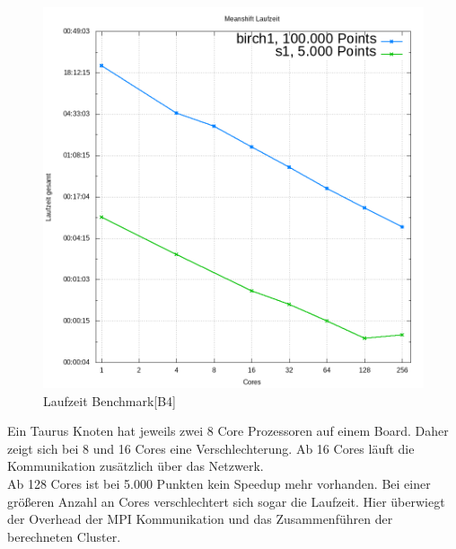 	\begin{figure}[H]
		\centering
		\includegraphics[scale=0.69]{../meanshift/output/pics/benchmark.png} 
		\caption{Laufzeit Benchmark[B4]}
	\end{figure}
	Ein Taurus Knoten hat jeweils zwei 8 Core Prozessoren auf einem Board. Daher zeigt sich bei 8 und 16 Cores eine Verschlechterung. 
	Ab 16 Cores läuft die Kommunikation zusätzlich über das Netzwerk.\\
	Ab 128 Cores ist bei 5.000 Punkten kein Speedup mehr vorhanden. Bei einer größeren Anzahl an Cores verschlechtert sich sogar die Laufzeit. Hier
	überwiegt der Overhead der MPI Kommunikation und das Zusammenführen der berechneten Cluster.\\
	\newpage
